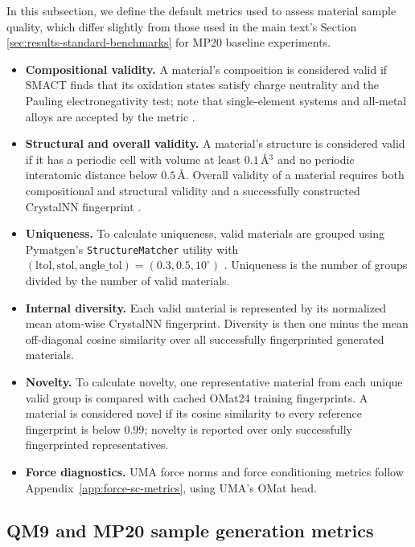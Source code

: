 \documentclass{article} %
\begin{document}
In this subsection, we define the default metrics used to assess material sample quality, which differ slightly from those used in the main text's Section \ref{sec:results-standard-benchmarks} for MP20 baseline experiments.

\begin{itemize}
  \item \textbf{Compositional validity.} A material's composition is considered valid if SMACT finds that its oxidation states satisfy charge neutrality and the Pauling electronegativity test; note that single-element systems and all-metal alloys are accepted by the metric \citep{davies2019smact}.
  \item \textbf{Structural and overall validity.} A material's structure is considered valid if it has a periodic cell with volume at least $0.1$\,\AA$^3$ and no periodic interatomic distance below $0.5$\,\AA. Overall validity of a material requires both compositional and structural validity and a successfully constructed CrystalNN fingerprint \citep{pan2021benchmarking}.
  \item \textbf{Uniqueness.} To calculate uniqueness, valid materials are grouped using Pymatgen's \texttt{StructureMatcher} utility with $(\mathrm{ltol},\mathrm{stol},\mathrm{angle\_tol})=(0.3,0.5,10^\circ)$ \citep{ong2013pymatgen}. Uniqueness is the number of groups divided by the number of valid materials.
  \item \textbf{Internal diversity.} Each valid material is represented
  by its normalized mean atom-wise CrystalNN fingerprint. Diversity is then one minus the mean off-diagonal cosine similarity over all successfully fingerprinted generated materials.
  \item \textbf{Novelty.} To calculate novelty, one representative material from each unique valid group is compared with cached OMat24 training fingerprints. A material is considered novel if its cosine similarity to every reference fingerprint is below $0.99$; novelty is reported over only successfully fingerprinted representatives.
  \item \textbf{Force diagnostics.} UMA force norms and force conditioning
  metrics follow Appendix~\ref{app:force-sc-metrics}, using UMA's OMat head.
\end{itemize}

\subsection{QM9 and MP20 sample generation metrics}
\label{app:metrics-qm9-mp20}
\end{document}
